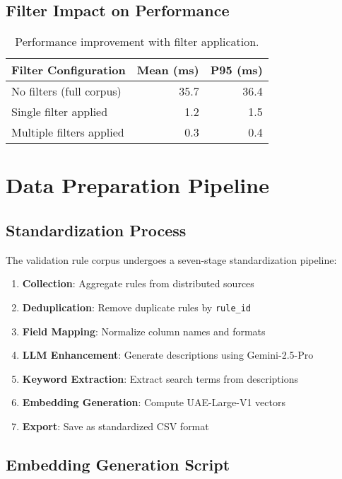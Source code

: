 \subsection{Filter Impact on Performance}

\begin{table}[!htbp]
\centering
\begin{tabular}{lrr}
\toprule
\textbf{Filter Configuration} & \textbf{Mean (ms)} & \textbf{P95 (ms)} \\
\midrule
No filters (full corpus) & 35.7 & 36.4 \\
Single filter applied & 1.2 & 1.5 \\
Multiple filters applied & 0.3 & 0.4 \\
\bottomrule
\end{tabular}
\caption{Performance improvement with filter application.}
\label{tab:filter-impact}
\end{table}

\clearpage
\section{Data Preparation Pipeline}
\label{sec:app-pipeline}

\subsection{Standardization Process}

The validation rule corpus undergoes a seven-stage standardization pipeline:

\begin{enumerate}[leftmargin=*,itemsep=3pt,topsep=3pt]
 \item \textbf{Collection}: Aggregate rules from distributed sources
 \item \textbf{Deduplication}: Remove duplicate rules by \texttt{rule\_id}
 \item \textbf{Field Mapping}: Normalize column names and formats
 \item \textbf{LLM Enhancement}: Generate descriptions using Gemini-2.5-Pro
 \item \textbf{Keyword Extraction}: Extract search terms from descriptions
 \item \textbf{Embedding Generation}: Compute UAE-Large-V1 vectors
 \item \textbf{Export}: Save as standardized CSV format
\end{enumerate}

\subsection{Embedding Generation Script}

